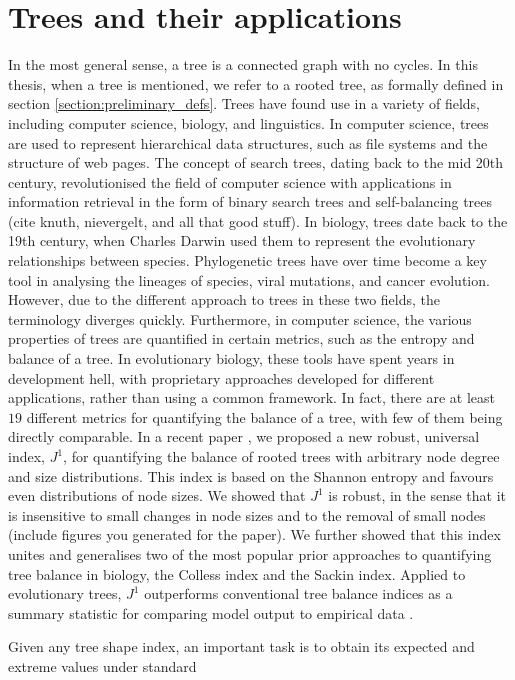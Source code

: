 \section{Trees and their applications}
In the most general sense, a tree is a connected graph with no cycles. In this thesis, when a tree is
mentioned, we refer to a rooted tree, as formally defined in section \ref{section:preliminary_defs}.
Trees have found use in a variety of fields, including computer science, biology, and linguistics.
In computer science, trees are used to represent hierarchical data structures, such as file systems and
the structure of web pages. The concept of search trees, dating back to the mid 20th century,
revolutionised the field of computer science with applications in information retrieval in the form of
binary search trees and self-balancing trees (cite knuth, nievergelt, and all that good stuff). In biology,
trees date back to the 19th century, when Charles Darwin used them to represent the evolutionary
relationships between species. Phylogenetic trees have over time become a key tool in analysing the
lineages of species, viral mutations, and cancer evolution. However, due to the different approach to
trees in these two fields, the terminology diverges quickly. Furthermore, in computer science, the
various properties of trees are quantified in certain metrics, such as the entropy and balance of a tree.
In evolutionary biology, these tools have spent years in development hell, with proprietary approaches
developed for different applications, rather than using a common framework. In fact, there are at least
$19$ different metrics for quantifying the balance of a tree, with few of them being directly comparable.
In a recent paper \cite{lemant_robust_2022}, we proposed a new robust, universal index, $J^1$, for quantifying the
balance of rooted trees with arbitrary node degree and size distributions. This index is based on the
Shannon entropy and favours even distributions of node sizes. We showed that $J^1$ is robust, in the sense
that it is insensitive to small changes in node sizes and to the removal of small nodes (include figures
you generated for the paper). We further showed that this index unites and generalises two of the most
popular prior approaches to quantifying tree balance in biology, the Colless index and the Sackin index.
Applied to evolutionary trees, $J^1$ outperforms conventional tree balance indices as a summary statistic
for comparing model output to empirical data \cite{noble_spatial_2022}.\par
Given any tree shape index, an important task is to obtain its expected and extreme values under standard

